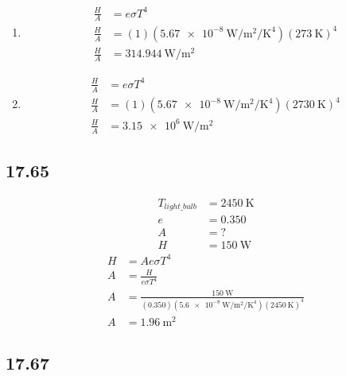 \documentclass{article}
\begin{document}
\begin{enumerate}[label = \boldalph]
	\item
		\begin{align*}
			\frac{ H }{ A } & = e\sigma T^4 \\
			\frac{ H }{ A } & = (1)(\SI{5.67e-8}{\watt \per \meter \squared \per \kelvin \tothe{4}})(\SI{273}{\kelvin})^4 \\
			\frac{ H }{ A } & = \SI{314.944}{\watt \per \meter \squared}
		\end{align*}
	\item
		\begin{align*}
			\frac{ H }{ A } & = e\sigma T^4 \\
			\frac{ H }{ A } & = (1)(\SI{5.67e-8}{\watt \per \meter \squared \per \kelvin \tothe{4}})(\SI{2730}{\kelvin})^4 \\
			\frac{ H }{ A } & = \SI{3.15e6}{\watt \per \meter \squared}
		\end{align*}
\end{enumerate}

\subsection{17.65}

\begin{align*}
	T_{light\_bulb} & = \SI{2450}{\kelvin} \\
	e & = 0.350 \\
	A & = ? \\
	H & = \SI{150}{\watt}
\end{align*}
\begin{align*}
	H & = Ae\sigma T^4 \\
	A & = \frac{ H }{ e\sigma T^4 } \\
	A & = \frac{ \SI{150}{\watt} }{ (0.350)(\SI{5.6e-8}{\watt \per \meter \squared \per \kelvin \tothe{4}})(\SI{2450}{\kelvin})^4 } \\
	A & = \SI{1.96}{\meter \squared}
\end{align*}

\subsection{17.67}
\end{document}
